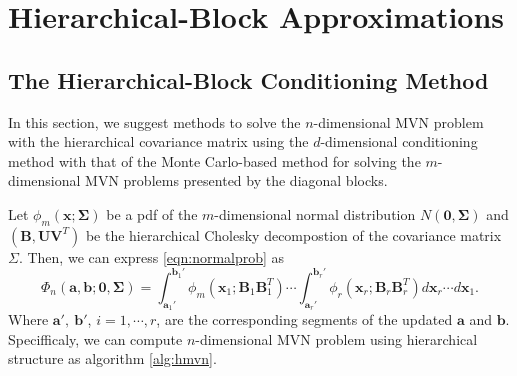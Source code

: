 
\section{Hierarchical-Block Approximations}\label{sec:hmvn}


\subsection{The Hierarchical-Block Conditioning Method}

In this section, we suggest methods to solve the $n$-dimensional MVN problem with the hierarchical covariance matrix using the $d$-dimensional conditioning method with that of the Monte Carlo-based method for solving the $m$-dimensional MVN problems presented by the diagonal blocks.

Let $\phi_m(\mathbf{x}; \boldsymbol{\Sigma})$ be a pdf of the $m$-dimensional normal distribution $N(\mathbf{0}, \boldsymbol{\Sigma})$ and $(\mathbf{B}, \mathbf{U}\mathbf{V}^T)$ be the hierarchical Cholesky decompostion of the covariance matrix $\Sigma$. Then, we can express \eqref{eqn:normalprob} as 
\begin{equation}\label{eqn:hmvn}
    \Phi_n(\mathbf{a}, \mathbf{b}; \mathbf{0}, \boldsymbol{\Sigma}) 
    = \int_{\mathbf{a}_1'}^{\mathbf{b}_1'} \phi_m(\mathbf{x}_1; \mathbf{B}_1\mathbf{B}_1^T) 
    \cdots 
    \int_{\mathbf{a}_r'}^{\mathbf{b}_r'} \phi_r(\mathbf{x}_r; \mathbf{B}_r\mathbf{B}_r^T) d\mathbf{x}_r \cdots d\mathbf{x}_1.
\end{equation}
Where $\mathbf{a}',~\mathbf{b}'$, $i=1,\cdots,r$, are the corresponding segments of the updated $\mathbf{a}$ and $\mathbf{b}$. Specifficaly, we can compute $n$-dimensional MVN problem using hierarchical structure as algorithm \ref{alg:hmvn}.

